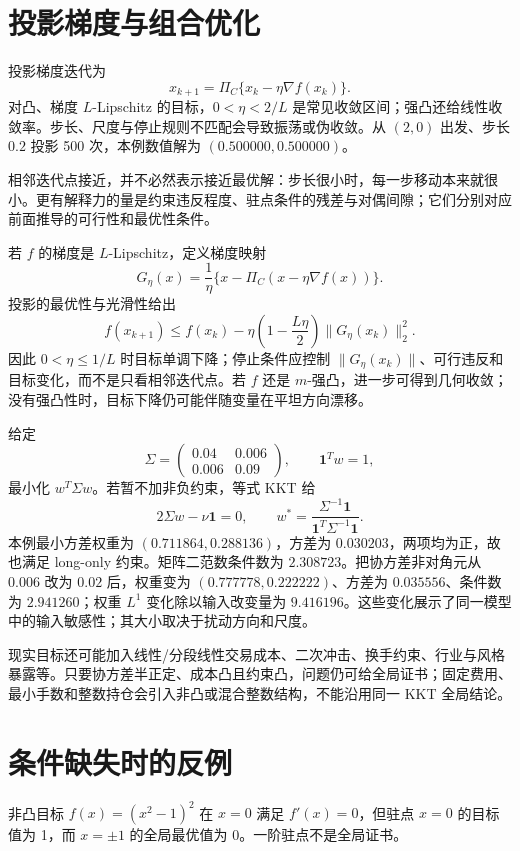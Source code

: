 \section{投影梯度与组合优化}

投影梯度迭代为
\[
x_{k+1}=\Pi_C\{x_k-\eta\nabla f(x_k)\}.
\]
对凸、梯度 $L$-Lipschitz 的目标，$0<\eta<2/L$ 是常见收敛区间；强凸还给线性收敛率。步长、尺度与停止规则不匹配会导致振荡或伪收敛。从 $(2,0)$ 出发、步长 $0.2$ 投影 500 次，本例数值解为 $(0.500000,0.500000)$。

相邻迭代点接近，并不必然表示接近最优解：步长很小时，每一步移动本来就很小。更有解释力的量是约束违反程度、驻点条件的残差与对偶间隙；它们分别对应前面推导的可行性和最优性条件。

若 $f$ 的梯度是 $L$-Lipschitz，定义梯度映射
\[
 G_\eta(x)=\frac1\eta\{x-\Pi_C(x-\eta\nabla f(x))\}.
\]
投影的最优性与光滑性给出
\[
 f(x_{k+1})\le f(x_k)
 -\eta\left(1-\frac{L\eta}{2}\right)\|G_\eta(x_k)\|_2^2.
\]
因此 $0<\eta\le1/L$ 时目标单调下降；停止条件应控制 $\|G_\eta(x_k)\|$、可行违反和目标变化，而不是只看相邻迭代点。若 $f$ 还是 $m$-强凸，进一步可得到几何收敛；没有强凸性时，目标下降仍可能伴随变量在平坦方向漂移。


给定
\[
\Sigma=\begin{pmatrix}0.04&0.006\\0.006&0.09\end{pmatrix},
\qquad \mathbf1^Tw=1,
\]
最小化 $w^T\Sigma w$。若暂不加非负约束，等式 KKT 给
\[
2\Sigma w-\nu\mathbf1=0,\qquad
w^*=\frac{\Sigma^{-1}\mathbf1}{\mathbf1^T\Sigma^{-1}\mathbf1}.
\]
本例最小方差权重为 $(0.711864,0.288136)$，方差为 $0.030203$，两项均为正，故也满足 long-only 约束。矩阵二范数条件数为 $2.308723$。把协方差非对角元从 $0.006$ 改为 $0.02$ 后，权重变为 $(0.777778,0.222222)$、方差为 $0.035556$、条件数为 $2.941260$；权重 $L^1$ 变化除以输入改变量为 $9.416196$。这些变化展示了同一模型中的输入敏感性；其大小取决于扰动方向和尺度。

现实目标还可能加入线性/分段线性交易成本、二次冲击、换手约束、行业与风格暴露等。只要协方差半正定、成本凸且约束凸，问题仍可给全局证书；固定费用、最小手数和整数持仓会引入非凸或混合整数结构，不能沿用同一 KKT 全局结论。

\section{条件缺失时的反例}

非凸目标 $f(x)=(x^2-1)^2$ 在 $x=0$ 满足 $f'(x)=0$，但驻点 $x=0$ 的目标值为 1，而 $x=\pm1$ 的全局最优值为 0。一阶驻点不是全局证书。

